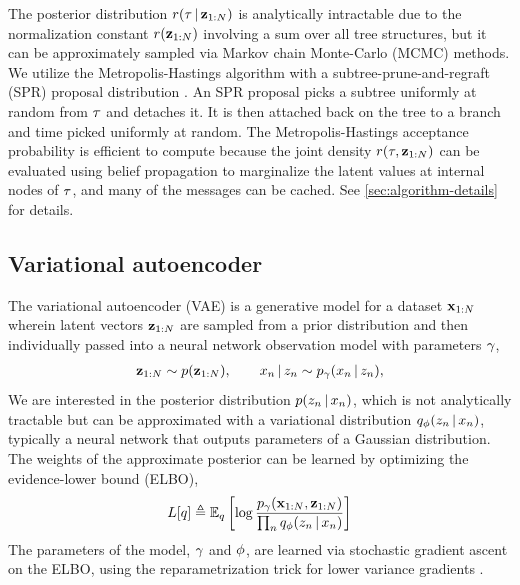 The posterior distribution $r(\tau \,|\, \mathbf{z}_{1:N})$
is analytically intractable due to the normalization constant
$r(\mathbf{z}_{1:N})$ involving a sum over all tree structures,
but it can be approximately sampled via Markov chain Monte-Carlo (MCMC) methods.
We utilize the Metropolis-Hastings
algorithm with a subtree-prune-and-regraft (SPR)
proposal distribution \citep{Neal2003}. An SPR proposal
picks a subtree uniformly at random from $\tau$
and detaches it.
It is then attached back on the tree
to a branch and time picked uniformly at random.
The Metropolis-Hastings acceptance probability is efficient to compute because the joint density $r(\tau, \mathbf{z}_{1:N})$ can be evaluated using belief propagation to marginalize the latent values at internal nodes of $\tau$, and many of the messages can be cached.
See \autoref{sec:algorithm-details} for details.

\subsection{Variational autoencoder}
The variational autoencoder (VAE) is a generative model
for a dataset $\mathbf{x}_{1:N}$
wherein latent vectors $\mathbf{z}_{1:N}$ are sampled
from a prior distribution
and then individually passed into
a neural network observation model with parameters $\gamma$,
\begin{equation}
    \begin{split}
        \mathbf{z}_{1:N} \sim p(\mathbf{z}_{1:N}),
        \qquad
        x_n \,|\, z_n \sim p_\gamma(x_n \,|\, z_n),
    \end{split}
\end{equation}
We are interested in the posterior distribution
$p(z_n \,|\, x_n)$, which is not analytically tractable
but can be approximated with a variational distribution
$q_\phi(z_n \,|\, x_n)$, typically a neural network
that outputs parameters of a Gaussian distribution.
The weights of the approximate posterior can be learned
by optimizing the evidence-lower bound (ELBO),
\begin{equation}
    \begin{split}
    L[q] &\triangleq \mathbb{E}_q \left[\log \frac{p_\gamma(\mathbf{x}_{1:N}, \mathbf{z}_{1:N})}{\prod_n q_\phi(z_n \,|\, x_n)}\right] \\
    \end{split}
\end{equation}
The parameters of the model, $\gamma$ and $\phi$,
are learned via stochastic gradient ascent on
the ELBO, using the reparametrization trick
for lower variance gradients \citep{Kingma2014, Rezende2014}.

